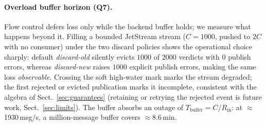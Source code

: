 \documentclass[runningheads]{llncs}
\begin{document}
\paragraph{Overload buffer horizon (Q7).}
Flow control defers loss only while the backend buffer holds; we measure what happens
beyond it. Filling a bounded JetStream stream ($C{=}1000$, pushed to $2C$ with no
consumer) under the two discard policies shows the operational choice sharply: default
\emph{discard-old} silently evicts $1000$ of $2000$ verdicts with $0$ publish errors,
whereas \emph{discard-new} raises $1000$ explicit publish errors, making the same loss
\emph{observable}. Crossing the soft high-water mark marks the stream \textsf{degraded};
the first rejected or evicted publication marks it \textsf{incomplete}, consistent with
the algebra of Sect.~\ref{sec:guarantees} (retaining or retrying the rejected event is
future work, Sect.~\ref{sec:limits}). The buffer absorbs an outage of
$T_{\text{buffer}}=C/R_{\text{in}}$: at $\approx$1930\,msg/s, a million-message buffer
covers $\approx$8.6\,min.
\end{document}
